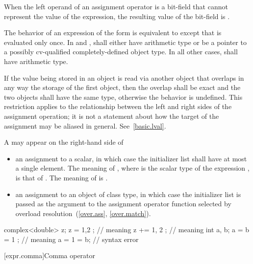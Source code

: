 \pnum
{}%
When the left operand of an assignment operator
is a bit-field that cannot represent the value of the expression, the
resulting value of the bit-field is
.

\pnum
The behavior of an expression of the form  \tcode{=}
 is equivalent to    except
that  is evaluated only once. In \tcode{+=} and \tcode{-=},
 shall either have arithmetic type or be a pointer to a
possibly cv-qualified completely-defined object type. In all other
cases,  shall have arithmetic type.

\pnum
If the value being stored in an object is read via another object that
overlaps in any way the storage of the first object, then the overlap shall be
exact and the two objects shall have the same type, otherwise the behavior is
undefined. \enternote This restriction applies to the relationship
between the left and right sides of the assignment operation; it is not a
statement about how the target of the assignment may be aliased in general.
See~\ref{basic.lval}. \exitnote

\pnum
A  may appear on the right-hand side of

\begin{itemize}
\item an assignment to a scalar, in which case the initializer list shall have
at most a single element. The meaning of , where  is the
scalar type of the expression , is that of . The meaning of
 is .

\item an assignment to an object of class type, in which case the initializer
list is passed as the argument to the assignment operator function selected by
overload resolution~(\ref{over.ass}, \ref{over.match}).
\end{itemize}

\enterexample
\begin{codeblock}
complex<double> z;
z = { 1,2 };              // meaning 
z += { 1, 2 };            // meaning 
int a, b;
a = b = { 1 };            // meaning 
a = { 1 } = b;            // syntax error
\end{codeblock}
\exitexample

[expr.comma]{Comma operator}%
%
%
%
%


